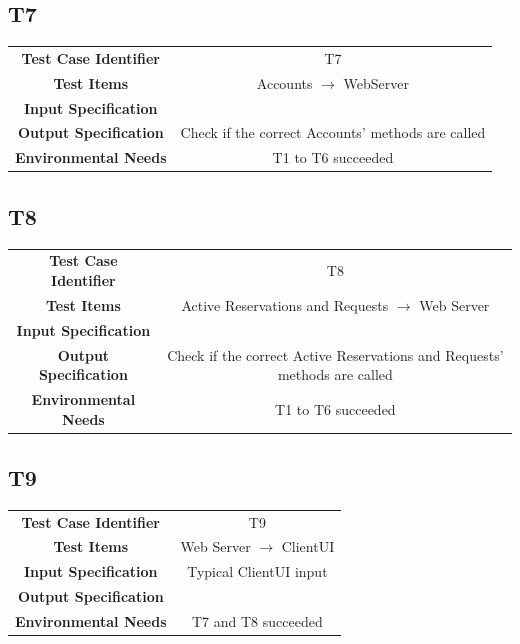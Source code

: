 \documentclass{article}
\begin{document}
\subsection{T7}
\begin{adjustbox}{width=1.2\textwidth}	
	\begin{tabular}{*{2}{c}}
		\toprule
		\midrule
		\textbf{Test Case Identifier} & T7\\
		\textbf{Test Items} & Accounts $\rightarrow$ WebServer\\
		\textbf{Input Specification} & \\ %
		\textbf{Output Specification} & Check if the correct Accounts' methods are called\\
		\textbf{Environmental Needs} & T1 to T6 succeeded\\
		\bottomrule
	\end{tabular}
\end{adjustbox}
\subsection{T8}
\begin{adjustbox}{width=1.2\textwidth}	
	\begin{tabular}{*{2}{c}}
		\toprule
		\midrule
		\textbf{Test Case Identifier} & T8\\
		\textbf{Test Items} & Active Reservations and Requests $\rightarrow$ Web Server\\
		\textbf{Input Specification} & \\ %
		\textbf{Output Specification} & Check if the correct Active Reservations and Requests' methods are called\\
		\textbf{Environmental Needs} & T1 to T6 succeeded\\
		\bottomrule
	\end{tabular}
\end{adjustbox}
\subsection{T9}
\begin{adjustbox}{width=1.2\textwidth}	
	\begin{tabular}{*{2}{c}}
		\toprule
		\midrule
		\textbf{Test Case Identifier} & T9\\
		\textbf{Test Items} & Web Server $\rightarrow$ ClientUI\\
		\textbf{Input Specification} & Typical ClientUI input\\
		\textbf{Output Specification} & \\ %
		\textbf{Environmental Needs} & T7 and T8 succeeded\\
		\bottomrule
	\end{tabular}
\end{adjustbox}
\end{document}

